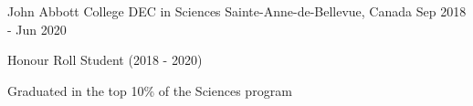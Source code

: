 \begin{cventries}
  \cventry
    {John Abbott College} %
    {DEC in Sciences} %
    {Sainte-Anne-de-Bellevue, Canada} %
    {Sep 2018 - Jun 2020} %
    {
      \begin{cvitems} %
        \item {Honour Roll Student (2018 - 2020)}
        \item {Graduated in the top 10\% of the Sciences program}
      \end{cvitems}
    }


\end{cventries}
